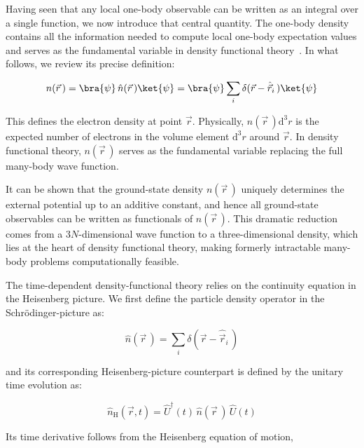 Having seen that any local one-body observable can be written as an integral over a single function,
we now introduce that central quantity.
The one-body density contains all the information needed to compute local one-body expectation values and serves as the fundamental variable in density functional theory~\cite{hohenberg1964inhomogeneous,jones2015density,maitra2016perspective}.
In what follows, we review its precise definition:

\begin{equation}
    n(\vec{r}\,)
    = \bra{\psi}\,\hat{n}(\vec{r}\,)\ket{\psi}
    = \bra{\psi}\sum_i\delta(\vec{r} - \hat{\vec{r}}_i\,)\ket{\psi}
\label{particle_density_operator_definition}
\end{equation}

This defines the electron density at point $\vec{r}$.
Physically, $n(\vec{r}\,)\mathrm{d}^3r$ is the expected number of electrons in the volume element $\mathrm{d}^3r$ around $\vec{r}$.
In density functional theory, $n(\vec{r}\,)$ serves as the fundamental variable replacing the full many-body wave function.  

It can be shown that the ground-state density $n(\vec{r}\,)$ uniquely determines the external potential up to an additive constant, and hence all ground-state observables can be written as functionals of $n(\vec{r}\,)$.
This dramatic reduction comes from a 3$N$-dimensional wave function to a three-dimensional density, which lies at the heart of density functional theory, making formerly intractable many-body problems computationally feasible.

The time-dependent density-functional theory relies on the continuity equation in the Heisenberg picture.
We first define the particle density operator in the Schrödinger-picture as:

\begin{equation}
    \hat{n}(\vec{r}\,)
    = \sum_i \delta(\vec{r}-\hat{\vec{r}}_i\,)
\label{Schrodinger-picture_density_operator}
\end{equation}

and its corresponding Heisenberg-picture counterpart is defined by the unitary time evolution as:

\begin{equation}
    \hat{n}_\mathrm{H}(\vec{r},t)
    = \hat U^\dagger(t)\,\hat{n}(\vec{r}\,)\,\hat{U}(t)
\label{Heisenberg-picture_density_operator}
\end{equation}

Its time derivative follows from the Heisenberg equation of motion,

